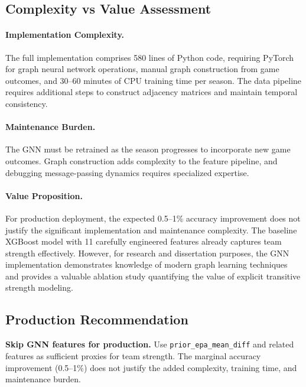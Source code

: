 \documentclass[12pt]{report}  %
\numberwithin{equation}{section}
\theoremstyle{plain}
\theoremstyle{definition}
\theoremstyle{remark}
\begin{document}
\subsection{Complexity vs Value Assessment}

\paragraph{Implementation Complexity.}
The full implementation comprises 580 lines of Python code, requiring PyTorch for graph neural network operations, manual graph construction from game outcomes, and 30--60 minutes of CPU training time per season. The data pipeline requires additional steps to construct adjacency matrices and maintain temporal consistency.

\paragraph{Maintenance Burden.}
The GNN must be retrained as the season progresses to incorporate new game outcomes. Graph construction adds complexity to the feature pipeline, and debugging message-passing dynamics requires specialized expertise.

\paragraph{Value Proposition.}
For production deployment, the expected 0.5--1\% accuracy improvement does not justify the significant implementation and maintenance complexity. The baseline XGBoost model with 11 carefully engineered features already captures team strength effectively. However, for research and dissertation purposes, the GNN implementation demonstrates knowledge of modern graph learning techniques and provides a valuable ablation study quantifying the value of explicit transitive strength modeling.

\subsection{Production Recommendation}
\textbf{Skip GNN features for production.} Use \texttt{prior\_epa\_mean\_diff} and related features as sufficient proxies for team strength. The marginal accuracy improvement (0.5--1\%) does not justify the added complexity, training time, and maintenance burden.
\end{document}

